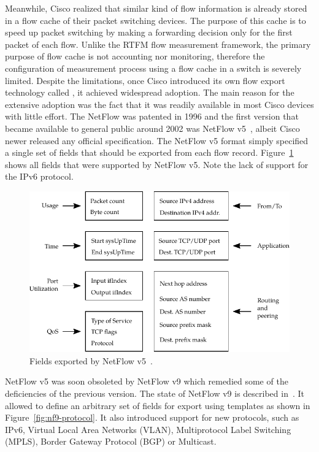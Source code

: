 Meanwhile, Cisco realized that similar kind of flow information is already stored in a flow cache of their packet switching devices. The purpose of this cache is to speed up packet switching by making a forwarding decision only for the first packet of each flow. Unlike the RTFM flow measurement framework, the primary purpose of flow cache is not accounting nor monitoring, therefore the configuration of measurement process using a flow cache in a switch is severely limited. Despite the limitations, once Cisco introduced its own flow export technology called , it achieved widespread adoption. The main reason for the extensive adoption was the fact that it was readily available in most Cisco devices with little effort. The NetFlow was patented in 1996 and the first version that became available to general public around 2002 was NetFlow v5~\cite{CiscoSystems-2007-NetFlow}, albeit Cisco newer released any official specification. The NetFlow v5 format simply specified a single set of fields that should be exported from each flow record. Figure~\ref{fig:nf5-fields} shows all fields that were supported by NetFlow v5. Note the lack of support for the IPv6 protocol.

\begin{figure}[t!]
  \begin{center}
    \includegraphics{figures/nf5-fields}
  \end{center}
  \caption{Fields exported by NetFlow v5~\cite{CiscoSystems-2007-NetFlow}.}
  \label{fig:nf5-fields}
\end{figure}

NetFlow v5 was soon obsoleted by NetFlow v9 which remedied some of the deficiencies of the previous version. The state of NetFlow v9 is described in~\cite{rfc3954}. It allowed to define an arbitrary set of fields for export using templates as shown in Figure~\ref{fig:nf9-protocol}. It also introduced support for new protocols, such as IPv6, Virtual Local Area Networks (VLAN), Multiprotocol Label Switching (MPLS), Border Gateway Protocol (BGP) or Multicast. 

